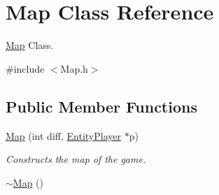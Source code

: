 \hypertarget{classMap}{
\section{Map Class Reference}
\label{classMap}
}


\hyperlink{classMap}{Map} Class.  


{\ttfamily \#include $<$Map.h$>$}\subsection*{Public Member Functions}
\begin{DoxyCompactItemize}
\item 
\hyperlink{classMap_aba466e7794843d6452e216e2c99fa69d}{Map} (int diff, \hyperlink{classEntityPlayer}{EntityPlayer} $\ast$p)
\begin{DoxyCompactList}\small\item\em Constructs the map of the game. \item\end{DoxyCompactList}\item 
\hypertarget{classMap_aa403fbe09394ccf39747588f5168e3b2}{
\hyperlink{classMap_aa403fbe09394ccf39747588f5168e3b2}{$\sim$Map} ()}
\label{classMap_aa403fbe09394ccf39747588f5168e3b2}


\end{DoxyCompactItemize}
